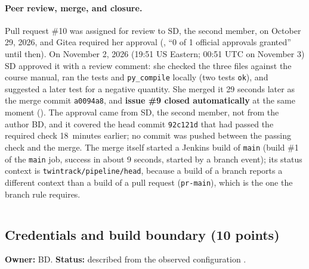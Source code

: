\begin{longlisting}
\inputminted[fontsize=\scriptsize]{text}{evidence/89-jenkins-pr10-build-2-controlled-failure-and-gitea-status-2026-11-02.txt}
\caption{Build \#2, the first controlled failure (commit \texttt{eb97d7a}), started manually, with the correction of an earlier wrong ``webhook-triggered'' label (real output).}
\label{Listing:E89}
\end{longlisting}

\paragraph{Peer review, merge, and closure.} Pull request \#10 was assigned for review to SD, the second member, on October 29, 2026, and Gitea required her
approval (, ``0 of 1 official approvals granted'' until then). On November 2, 2026 (19:51 US Eastern; 00:51 UTC on November 3) SD approved it
with a review comment: she checked the three files against the course manual, ran the tests and \texttt{py\_compile} locally (two tests \texttt{ok}), and
suggested a later test for a negative quantity. She merged it 29 seconds later as the merge commit \texttt{a0094a8}, and \textbf{issue \#9 closed automatically}
at the same moment (). The approval came from SD, the second member, not from the author BD, and it covered the head commit
\texttt{92c121d} that had passed the required check 18~minutes earlier; no commit was pushed between the passing check and the merge. The merge itself started a Jenkins build of \texttt{main} (build \#1 of the \texttt{main} job,
success in about 9 seconds, started by a branch event); its status context is \texttt{twintrack/pipeline/head}, because a build of a branch reports a
different context than a build of a pull request (\texttt{pr-main}), which is the one the branch rule requires.

\begin{longlisting}
\inputminted[fontsize=\scriptsize]{text}{evidence/106-pr10-review-merge-issue-closed-and-main-build-2026-11-02.txt}
\caption{Pull request \#10: SD's review and approval, the merge (commit \texttt{a0094a8}), issue \#9 closed automatically, and the Jenkins build of \texttt{main}, November 2, 2026 (real output).}
\label{Listing:E106}
\end{longlisting}

\subsection{Credentials and build boundary (10 points)}
\label{Section:jenkBoundary}
\textbf{Owner:} BD. \textbf{Status:} described from the observed configuration \StatusPass.

